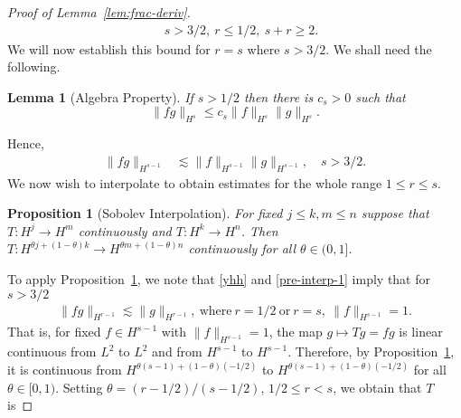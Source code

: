 \documentclass[12pt,reqno]{amsart}
\numberwithin{equation}{section}  %
\numberwithin{figure}{section}
\newtheorem{lemma}[theorem]{Lemma}
\newtheorem{proposition}[theorem]{Proposition}
\begin{document}
\begin{proof}[Proof of Lemma~\ref{lem:frac-deriv}]
\begin{equation}
\begin{split}
  \quad s > 3/2, \ r \le 1/2, \ s + r \ge 2.
\end{split}
\end{equation}
We will now establish this bound for $r=s$ where $s > 3/2$. We shall need the following. 
%
%
\begin{lemma}[Algebra Property]
  \label{lem:alg-prop}
If  $s>1/2$ then there is $c_s>0$ such that 
%
%
%
\begin{equation} \label{KP-com-est}
  \| fg\|_{H^{s}} \le c_s \| f \|_{H^{s}} \| g \|_{H^{s}}.
\end{equation}
%
%
%
\end{lemma}
%
%
%
%
%
Hence,
%
%
\begin{equation}
  \label{pre-interp-1}
\begin{split}
  \| f g \|_{H^{s-1}}
  & \lesssim   \|f  \|_{H^{s-1}} \| g \|_{H^{s-1}}, \quad s >3/2.
\end{split}
\end{equation}
%
%
%
%
%
%
%
We now wish to interpolate to obtain estimates for the whole range $1 \le r \le
s$.
%
%
%
%
%                
%
%
%
%
\begin{proposition}[Sobolev Interpolation]
  For fixed $j \le k, m \le n$ suppose that \\ $T: H^{j} \to H^{m}$ continuously
and $T: H^{k} \to H^{n}$. Then\\ $T: H^{\theta j + (1 - \theta)k} \to H^{\theta
m + (1 - \theta) n}$ continuously for all $\theta \in (0,1]$.
\label{prop:sob-interp}
\end{proposition}
%
To apply Proposition~\ref{prop:sob-interp}, we note that \eqref{yhh}
and \eqref{pre-interp-1} imply that for $s > 3/2$
%
%
\begin{equation*}
\begin{split}
    \| f g \|_{H^{r-1}} \lesssim \| g \|_{H^{r-1}}, \  \text{where} \ 
  r=1/2 \ \text{or} \  r =s, \ \| f \|_{H^{s-1}} =1.
\end{split}
\end{equation*}
%
%
That is, for fixed $f \in H^{s-1}$ with $\| f \|_{H^{s-1}} =1$, the map $g \mapsto
Tg = fg$ is linear continuous from $L^{2}$ to $L^{2}$ and from $H^{s-1}$ to
$H^{s-1}$. Therefore, by Proposition~\ref{prop:sob-interp}, it is continuous from
$H^{\theta (s-1) + (1 - \theta)(-1/2) }$ to $H^{\theta (s-1) + (1 - \theta)(-1/2) }$ for all $\theta \in
[0, 1)$. Setting $\theta = (r-1/2)/(s-1/2)$, $ 1/2 \le r < s$, we obtain that $T$ is

\end{proof}
\end{document}
